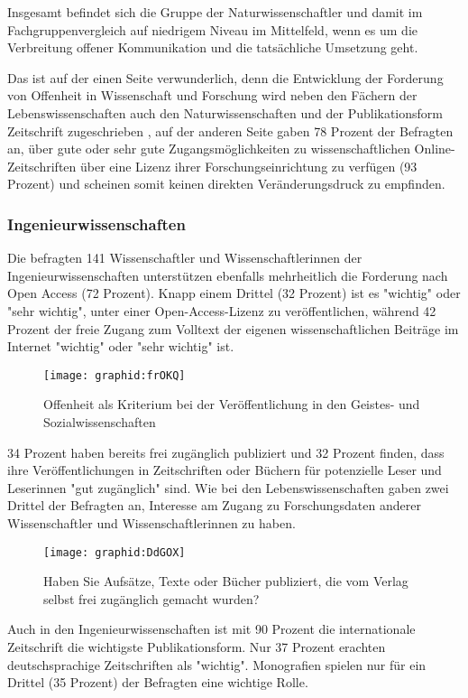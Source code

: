 Insgesamt befindet sich die Gruppe der Naturwissenschaftler und damit im Fachgruppenvergleich auf niedrigem Niveau im Mittelfeld, wenn es um die Verbreitung offener Kommunikation und die tatsächliche Umsetzung geht.

Das ist auf der einen Seite verwunderlich, denn die Entwicklung der Forderung von Offenheit in Wissenschaft und Forschung wird neben den Fächern der Lebenswissenschaften auch den Naturwissenschaften und der Publikationsform Zeitschrift zugeschrieben \cite{Naeder_2010}, auf der anderen Seite gaben 78 Prozent der Befragten an, über gute oder sehr gute Zugangsmöglichkeiten zu wissenschaftlichen Online-Zeitschriften über eine Lizenz ihrer Forschungseinrichtung zu verfügen (93 Prozent) und scheinen somit keinen direkten Veränderungsdruck zu empfinden.

\subsubsection{Ingenieurwissenschaften}

Die befragten 141 Wissenschaftler und Wissenschaftlerinnen der Ingenieurwissenschaften  unterstützen ebenfalls mehrheitlich die Forderung nach Open Access (72 Prozent). Knapp einem Drittel (32 Prozent) ist es "wichtig" oder "sehr wichtig", unter einer Open-Access-Lizenz zu veröffentlichen, während 42 Prozent der freie Zugang zum Volltext der eigenen wissenschaftlichen Beiträge im Internet "wichtig" oder "sehr wichtig" ist.

\begin{figure}[h!]
\texttt{[image: graphid:frOKQ]}
\caption{Offenheit als Kriterium bei der Veröffentlichung in den Geistes- und Sozialwissenschaften}
\end{figure}

34 Prozent haben bereits frei zugänglich publiziert und 32 Prozent finden, dass ihre Veröffentlichungen in Zeitschriften oder Büchern für potenzielle Leser und Leserinnen "gut zugänglich" sind. Wie bei den Lebenswissenschaften gaben zwei Drittel der Befragten an, Interesse am Zugang zu Forschungsdaten anderer Wissenschaftler und Wissenschaftlerinnen zu haben.

\begin{figure}[h!]
\texttt{[image: graphid:DdGOX]}
\caption{Haben Sie Aufsätze, Texte oder Bücher publiziert, die vom Verlag selbst frei zugänglich gemacht wurden?}
\end{figure}

Auch in den Ingenieurwissenschaften ist mit 90 Prozent die internationale Zeitschrift die wichtigste Publikationsform. Nur 37 Prozent erachten deutschsprachige Zeitschriften als "wichtig". Monografien spielen nur für ein Drittel (35 Prozent) der Befragten eine wichtige Rolle.
